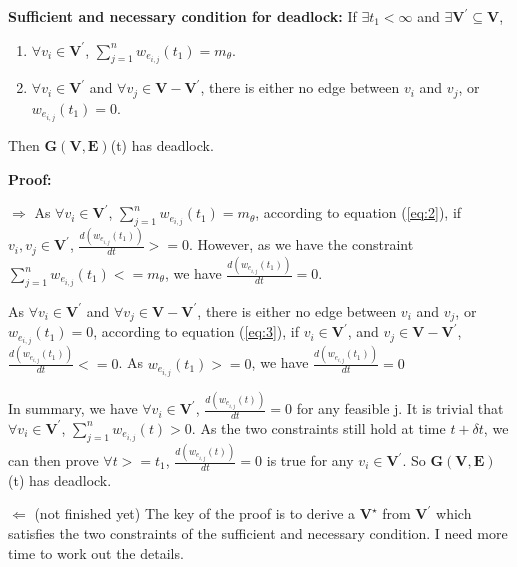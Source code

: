 \textbf{Sufficient and necessary condition for deadlock:} If $\exists t_1<\infty$ and $\exists \textbf{V}^\prime \subseteq \textbf{V}$,
 \begin{enumerate}
\item $\forall v_i \in \textbf{V}^\prime$,  $\sum_{j=1}^{n} w_{e_{i,j}}(t_1) = m_{\theta}$.

\item $\forall v_i \in \textbf{V}^\prime$ and $\forall v_j \in \textbf{V}-\textbf{V}^\prime$, there is either no edge between $v_i$ and $v_j$, or $w_{e_{i,j}}(t_1)=0$.
\end{enumerate}

Then $\textbf{G}(\textbf{V},\textbf{E})$(t) has deadlock.

\textbf{Proof:}

$\Rightarrow$ As $\forall v_i \in \textbf{V}^\prime$,  $\sum_{j=1}^{n} w_{e_{i,j}}(t_1) = m_{\theta}$, according to equation (\ref{eq:2}), if $v_i,v_j \in \textbf{V}^\prime$, $\frac{d(w_{e_{i,j}}(t_1))}{dt} >= 0$. However, as we have the constraint $\sum_{j=1}^{n} w_{e_{i,j}}(t_1) <= m_{\theta}$, we have $\frac{d(w_{e_{i,j}}(t_1))}{dt} = 0$.

As $\forall v_i \in \textbf{V}^\prime$ and $\forall v_j \in \textbf{V}-\textbf{V}^\prime$, there is either no edge between $v_i$ and $v_j$, or $w_{e_{i,j}}(t_1)=0$, according to equation (\ref{eq:3}), if $v_i \in \textbf{V}^\prime$, and $v_j \in \textbf{V}-\textbf{V}^\prime$, $\frac{d(w_{e_{i,j}}(t_1))}{dt} <= 0$. As $w_{e_{i,j}}(t_1)>=0$, we have $\frac{d(w_{e_{i,j}}(t_1))}{dt} = 0$

In summary, we have $\forall v_i \in \textbf{V}^\prime$, $\frac{d(w_{e_{i,j}}(t))}{dt}=0$ for any feasible j. It is trivial that $\forall v_i \in \textbf{V}^\prime$, $\sum_{j=1}^{n} w_{e_{i,j}}(t) > 0$. As the two constraints still hold at time $t+\delta t$, we can then prove $\forall t >= t_1$, $\frac{d(w_{e_{i,j}}(t))}{dt}=0$ is true for any $v_i \in \textbf{V}^\prime$. So $\textbf{G}(\textbf{V},\textbf{E})$(t) has deadlock.

$\Leftarrow$ (not finished yet) The key of the proof is to derive a $\textbf{V}^\star$ from $\textbf{V}^\prime$ which satisfies the two constraints of the sufficient and necessary condition. I need more time to work out the details.






